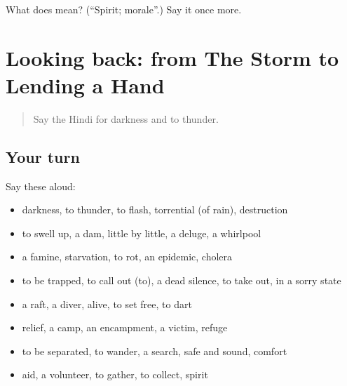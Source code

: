 \begin{tcolorbox}[breakable,colback=teal!4,colframe=teal!35!black,title={Before you move on}]
What does  mean? (\textquotedblleft{}Spirit; morale\textquotedblright{}.) Say it once more.
\end{tcolorbox}
\section[(dialogue)]{Looking back: from The Storm to Lending a Hand}

\label{lesson:HI-R311-review-304-311}



\begin{quote}
Say the Hindi for darkness and to thunder.
\end{quote}

\subsection*{Your turn}
Say these aloud:

\begin{itemize}
\raggedright
  \item darkness, to thunder, to flash, torrential (of rain), destruction
  \item to swell up, a dam, little by little, a deluge, a whirlpool
  \item a famine, starvation, to rot, an epidemic, cholera
  \item to be trapped, to call out (to), a dead silence, to take out, in a sorry state
  \item a raft, a diver, alive, to set free, to dart
  \item relief, a camp, an encampment, a victim, refuge
  \item to be separated, to wander, a search, safe and sound, comfort
  \item aid, a volunteer, to gather, to collect, spirit
\end{itemize}

